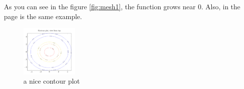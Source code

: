 \documentclass{article}
\begin{document}
As you can see in the figure \ref{fig:mesh1}, the function grows near 0. Also, in the page \pageref{fig:mesh1} is the same example.


\begin{figure}[h]
    \centering
    \includegraphics[width=0.25\textwidth]{contour}
    \caption{a nice contour plot}
    \label{fig:mesh2}
\end{figure}

\newpage


\listoffigures

\end{document}
